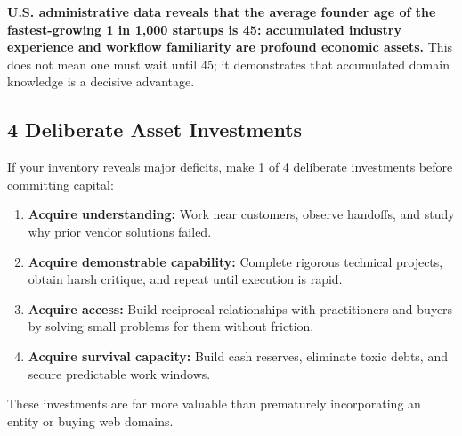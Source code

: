 \textbf{U.S. administrative data reveals that the average founder age of the fastest-growing 1 in 1,000 startups is 45: accumulated industry experience and workflow familiarity are profound economic assets.} This does not mean one must wait until 45; it demonstrates that accumulated domain knowledge is a decisive advantage.

\subsection{4 Deliberate Asset Investments}

If your inventory reveals major deficits, make 1 of 4 deliberate investments before committing capital:

\begin{enumerate}[label=\textbf{\arabic*.},leftmargin=11pt,itemsep=1.5pt,topsep=1.5pt,parsep=0pt]
  \item \textbf{Acquire understanding:} Work near customers, observe handoffs, and study why prior vendor solutions failed.
  \item \textbf{Acquire demonstrable capability:} Complete rigorous technical projects, obtain harsh critique, and repeat until execution is rapid.
  \item \textbf{Acquire access:} Build reciprocal relationships with practitioners and buyers by solving small problems for them without friction.
  \item \textbf{Acquire survival capacity:} Build cash reserves, eliminate toxic debts, and secure predictable work windows.
\end{enumerate}

These investments are far more valuable than prematurely incorporating an entity or buying web domains.
